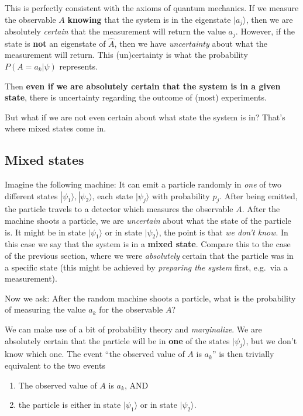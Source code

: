 \documentclass[a4]{article}
\providecommand{\tightlist}{%
  \setlength{\itemsep}{0pt}\setlength{\parskip}{0pt}}
\begin{document}
This is perfectly consistent with the axioms of quantum mechanics. If we
measure the observable $A$ \textbf{knowing} that the system is in the
eigenstate $|a_j\rangle$, then we are absolutely \emph{certain} that
the measurement will return the value $a_j$. However, if the state is
\textbf{not} an eigenstate of $\hat{A}$, then we have
\emph{uncertainty} about what the measurement will return. This
(un)certainty is what the probability $P(A=a_k|\psi)$ represents.

Then \textbf{even if we are absolutely certain that the system is in a
given state}, there is uncertainty regarding the outcome of (most)
experiments.

But what if we are not even certain about what state the system is in?
That's where mixed states come in.

\subsection{Mixed states}
\label{sec:mixed-states}

Imagine the following machine: It can emit a particle randomly in
\emph{one} of two different states $|\psi_1\rangle,|\psi_2\rangle$,
each state $|\psi_j\rangle$ with probability $p_j$. After being
emitted, the particle travels to a detector which measures the
observable $A$. After the machine shoots a particle, we are
\emph{uncertain} about what the state of the particle is. It might be in
state $|\psi_1\rangle$ or in state $|\psi_2\rangle$, the point is
that \emph{we don't know}. In this case we say that the system is in a
\textbf{mixed state}. Compare this to the case of the previous section,
where we were \emph{absolutely} certain that the particle was in a
specific state (this might be achieved by \emph{preparing the system}
first, e.g.~via a measurement).

Now we ask: After the random machine shoots a particle, what is the
probability of measuring the value $a_k$ for the observable $A$?

We can make use of a bit of probability theory and \emph{marginalize}.
We are absolutely certain that the particle will be in \textbf{one} of
the states $|\psi_j\rangle$, but we don't know which one. The event
``the observed value of $A$ is $a_k$'' is then trivially equivalent
to the two events

\begin{enumerate}
\def\labelenumi{\arabic{enumi}.}
\tightlist
\item
  The observed value of $A$ is $a_k$, AND
\item
  the particle is either in state $\vert\psi_1 \rangle $ or in state
  $\vert\psi_2 \rangle$.
\end{enumerate}
\end{document}
